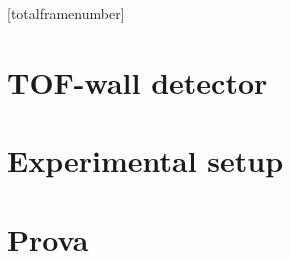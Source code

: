 \documentclass[9pt]{beamer}
\begin{document}
	[totalframenumber] 
	\frame{\titlepage}

	


	\section{TOF-wall detector}
		


	\section{Experimental setup}
		
		
	\section{Prova}
		
		
\end{document}

